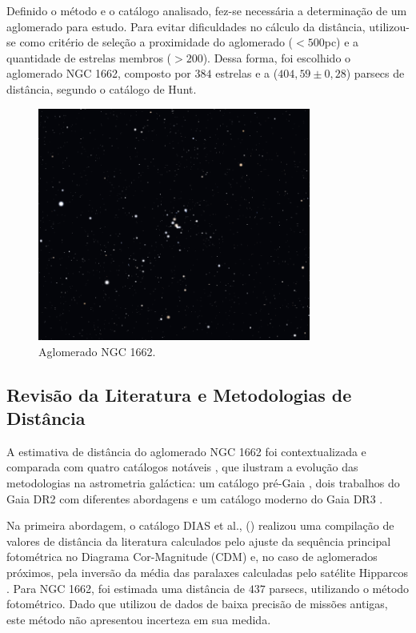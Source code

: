 \documentclass[12pt]{projeto}
\begin{document}
Definido o método e o catálogo analisado, fez-se necessária a determinação de um aglomerado para estudo. Para evitar dificuldades no cálculo da distância, utilizou-se como critério de seleção a proximidade do aglomerado (\(<500\)pc) e a quantidade de estrelas membros (\(>200\)). Dessa forma, foi escolhido o aglomerado NGC 1662, composto por \(384\) estrelas e a (\(404,59 \pm 0,28\)) parsecs de distância, segundo o catálogo de Hunt.
\begin{figure}[ht]
\centering
\includegraphics[width= 0.8\textwidth]{NGC_1662.png}
\caption{\label{fig:Capivara_decomposition} Aglomerado NGC 1662.}
\end{figure}

\subsection{Revisão da Literatura e Metodologias de Distância}

A estimativa de distância do aglomerado NGC 1662 foi contextualizada e comparada com quatro catálogos notáveis , que ilustram a evolução das metodologias na astrometria galáctica: um catálogo pré-Gaia \cite{dias_new_2002}, dois trabalhos do Gaia DR2 com diferentes abordagens \cite{cantat-gaudin_painting_2020, dias_updated_2021} e um catálogo moderno do Gaia DR3 \cite{hunt_improving_2024}.

Na primeira abordagem, o catálogo DIAS et al., (\citeyear{dias_new_2002})  realizou uma compilação de valores de distância da literatura calculados pelo ajuste da sequência principal fotométrica no Diagrama Cor-Magnitude (CDM) e, no caso de aglomerados próximos, pela inversão da média das paralaxes calculadas pelo satélite Hipparcos \cite{esa_hipparcos_1997}. Para NGC 1662, foi estimada uma distância de \(437\) parsecs, utilizando o método fotométrico. Dado que utilizou de dados de baixa precisão de missões antigas, este método não apresentou incerteza em sua medida.
\end{document}
